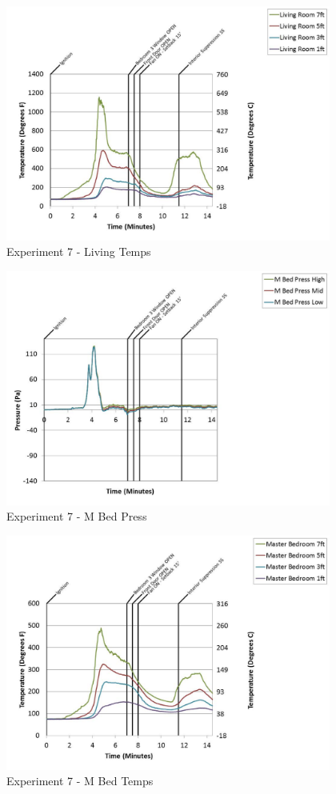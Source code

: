 \documentclass{article}
\begin{document}
\begin{appendices}
	\clearpage

	\begin{figure}[h!]
		\centering
		\includegraphics[height=3.05in]{0_Images/Results_Charts/Exp_7_Charts/LivingTemps.pdf}
		\caption{Experiment 7 - Living Temps}
	\end{figure}
 

	\begin{figure}[h!]
		\centering
		\includegraphics[height=3.05in]{0_Images/Results_Charts/Exp_7_Charts/MBedPress.pdf}
		\caption{Experiment 7 - M Bed Press}
	\end{figure}
 
	\clearpage

	\begin{figure}[h!]
		\centering
		\includegraphics[height=3.05in]{0_Images/Results_Charts/Exp_7_Charts/MBedTemps.pdf}
		\caption{Experiment 7 - M Bed Temps}
	\end{figure}
 


\end{appendices}
\end{document}
